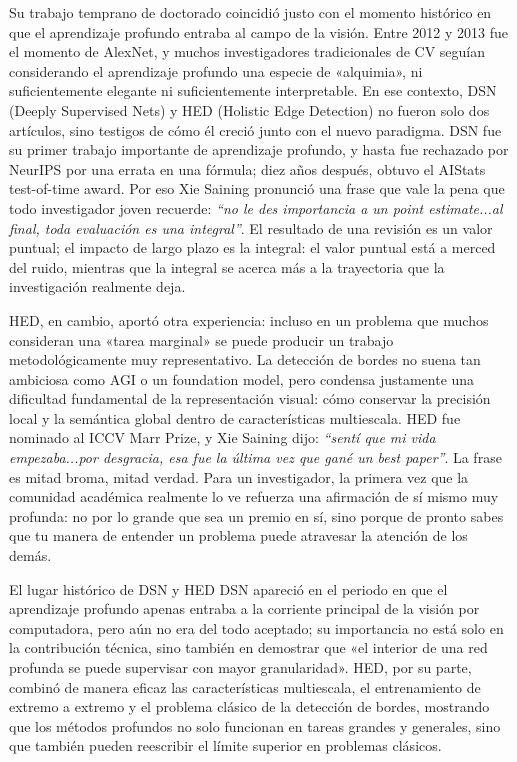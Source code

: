 Su trabajo temprano de doctorado coincidió justo con el momento histórico en que el aprendizaje profundo entraba al campo de la visión. Entre 2012 y 2013 fue el momento de AlexNet, y muchos investigadores tradicionales de CV seguían considerando el aprendizaje profundo una especie de «alquimia», ni suficientemente elegante ni suficientemente interpretable. En ese contexto, DSN (Deeply Supervised Nets) y HED (Holistic Edge Detection) no fueron solo dos artículos, sino testigos de cómo él creció junto con el nuevo paradigma. DSN fue su primer trabajo importante de aprendizaje profundo, y hasta fue rechazado por NeurIPS por una errata en una fórmula; diez años después, obtuvo el AIStats test-of-time award. Por eso Xie Saining pronunció una frase que vale la pena que todo investigador joven recuerde: \textit{``no le des importancia a un point estimate...al final, toda evaluación es una integral''}. El resultado de una revisión es un valor puntual; el impacto de largo plazo es la integral: el valor puntual está a merced del ruido, mientras que la integral se acerca más a la trayectoria que la investigación realmente deja.

HED, en cambio, aportó otra experiencia: incluso en un problema que muchos consideran una «tarea marginal» se puede producir un trabajo metodológicamente muy representativo. La detección de bordes no suena tan ambiciosa como AGI o un foundation model, pero condensa justamente una dificultad fundamental de la representación visual: cómo conservar la precisión local y la semántica global dentro de características multiescala. HED fue nominado al ICCV Marr Prize, y Xie Saining dijo: \textit{``sentí que mi vida empezaba...por desgracia, esa fue la última vez que gané un best paper''}. La frase es mitad broma, mitad verdad. Para un investigador, la primera vez que la comunidad académica realmente lo ve refuerza una afirmación de sí mismo muy profunda: no por lo grande que sea un premio en sí, sino porque de pronto sabes que tu manera de entender un problema puede atravesar la atención de los demás.

\begin{knowledgebox}{El lugar histórico de DSN y HED}
DSN apareció en el periodo en que el aprendizaje profundo apenas entraba a la corriente principal de la visión por computadora, pero aún no era del todo aceptado; su importancia no está solo en la contribución técnica, sino también en demostrar que «el interior de una red profunda se puede supervisar con mayor granularidad». HED, por su parte, combinó de manera eficaz las características multiescala, el entrenamiento de extremo a extremo y el problema clásico de la detección de bordes, mostrando que los métodos profundos no solo funcionan en tareas grandes y generales, sino que también pueden reescribir el límite superior en problemas clásicos.
\end{knowledgebox}

